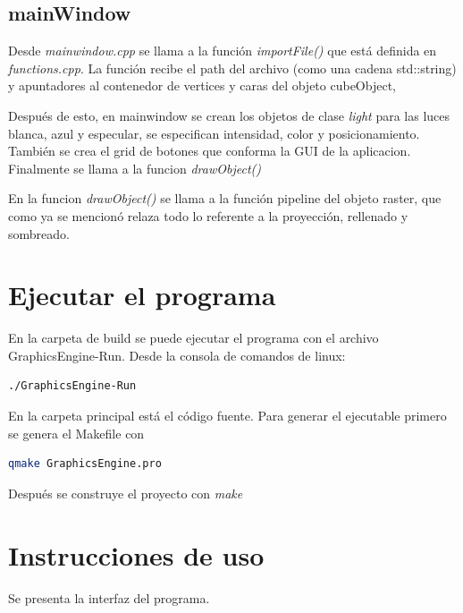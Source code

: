 \documentclass[12pt]{article}
\begin{document}
\subsection{mainWindow}
Desde \textit{mainwindow.cpp} se llama a la función \textit{importFile()} que está definida en \textit{functions.cpp}. La función recibe el path del archivo (como una cadena std::string) y apuntadores al contenedor de vertices y caras del objeto cubeObject,

Después de esto, en mainwindow se crean los objetos de clase \textit{light} para las luces blanca, azul y especular, se especifican intensidad, color y posicionamiento. También se crea el grid de botones que conforma la GUI de la aplicacion. Finalmente se llama a la funcion \textit{drawObject()}

En la funcion  \textit{drawObject()} se llama a la función pipeline del objeto raster, que como ya se mencionó relaza todo lo referente a la proyección, rellenado y sombreado.


\section{Ejecutar el programa}
En la carpeta de build se puede ejecutar el programa con el archivo GraphicsEngine-Run. Desde la consola de comandos de linux:

\begin{lstlisting}[language=bash,title={bash}]
./GraphicsEngine-Run
\end{lstlisting}


En la carpeta principal está el código fuente. Para generar el ejecutable primero se genera el Makefile con

\begin{lstlisting}[language=bash,title={bash}]
 qmake GraphicsEngine.pro
\end{lstlisting}

Después se construye el proyecto con \textit{make}



\section{Instrucciones de uso}
Se presenta la interfaz del programa.
\end{document}
